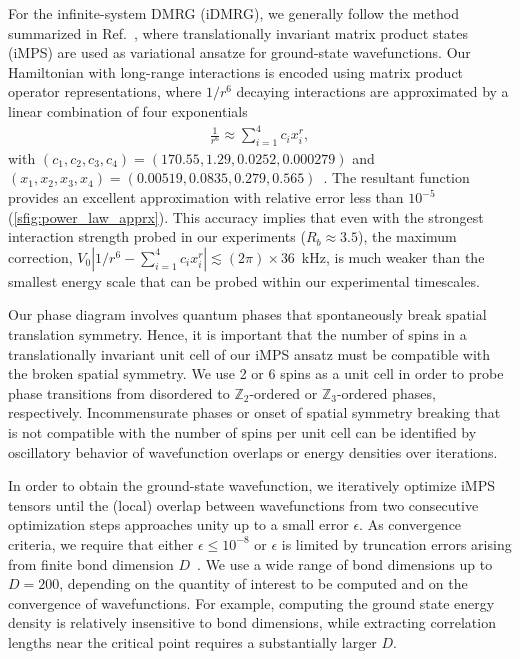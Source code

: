 \documentclass[prl,nobalancelastpage,superscriptaddress,twocolumn,nofootinbib]{revtex4}
\begin{document}
For the infinite-system DMRG (iDMRG), we generally follow the method summarized in Ref.~\cite{McCulloch2008}, where translationally invariant matrix product states (iMPS) are used as variational ansatze for ground-state wavefunctions. Our Hamiltonian with long-range interactions is encoded using matrix product operator representations, where $1/r^6$ decaying interactions are approximated by a linear combination of four exponentials
\begin{align}
\frac{1}{r^6} \approx \sum_{i=1}^4 c_i x_i^r,
\end{align}
with $(c_1, c_2, c_3, c_4) = (170.55, 1.29, 0.0252, 0.000279) $ and $(x_1, x_2, x_3, x_4) = (0.00519, 0.0835, 0.279, 0.565) $~\cite{Pirvu2010}. The resultant function provides an excellent approximation with relative error less than $10^{-5}$ (\ref{sfig:power_law_apprx}). This accuracy implies that even with the strongest interaction strength probed in our experiments ($R_b \approx 3.5$), the maximum correction, $V_0 \left|1/r^6 - \sum_{i=1}^4 c_i x_i^r\right| \lesssim (2\pi)\times 36$~kHz, is much weaker than the smallest energy scale that can be probed within our experimental timescales.

Our phase diagram involves quantum phases that spontaneously break spatial translation symmetry. Hence, it is important that the number of spins in a translationally invariant unit cell of our iMPS ansatz must be compatible with the broken spatial symmetry. We use 2 or 6 spins as a unit cell in order to probe phase transitions from disordered to $\mathbb{Z}_2$-ordered or $\mathbb{Z}_3$-ordered phases, respectively.
Incommensurate phases or onset of spatial symmetry breaking that is not compatible with the number of spins per unit cell can be identified by oscillatory behavior of wavefunction overlaps or energy densities over iterations.

In order to obtain the ground-state wavefunction, we iteratively optimize iMPS tensors until the (local) overlap between wavefunctions from two consecutive optimization steps approaches unity up to a small error $\epsilon$. As convergence criteria, we require that either $\epsilon \leq 10^{-8}$ or $\epsilon$ is limited by truncation errors arising from finite bond dimension $D$~\cite{McCulloch2008}. We use a wide range of bond dimensions up to $D = 200$, depending on the quantity of interest to be computed and on the convergence of wavefunctions. For example, computing the ground state energy density is relatively insensitive to bond dimensions, while extracting correlation lengths near the critical point requires  a substantially larger $D$.
\end{document}

